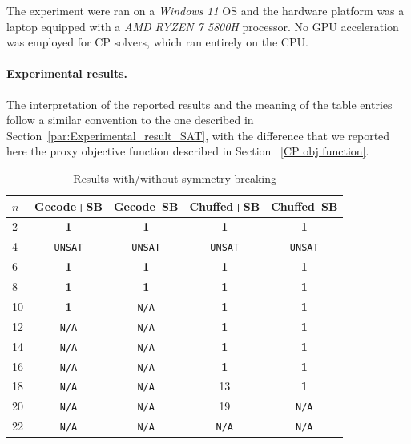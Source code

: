 The experiment were ran on a \textit{Windows 11} OS and the hardware platform was a laptop equipped with a \textit{AMD RYZEN 7 5800H} processor. No GPU acceleration was employed for CP solvers, which ran entirely on
the CPU.  \\



\paragraph{Experimental results.}
The interpretation of the reported results and the meaning of the table entries follow a similar convention to the one described in Section~\ref{par:Experimental_result_SAT}, with the difference that we reported here the proxy objective function described in Section ~\ref{CP obj function}.
\begin{table}[h]
\centering
\caption{Results with/without symmetry breaking}
\label{tab:cp}
\begin{tabular}{lcccc}
\toprule
\textbf{$n$} & \textbf{Gecode+SB} & \textbf{Gecode--SB} & \textbf{Chuffed+SB} & \textbf{Chuffed--SB}\\
\midrule
2  & \textbf{1} & \textbf{1} & \textbf{1} & \textbf{1} \\
4  &\texttt{UNSAT}&\texttt{UNSAT}&\texttt{UNSAT}&\texttt{UNSAT}\\
6  & \textbf{1}  &\textbf{1}  & \textbf{1} & \textbf{1} \\
8  & \textbf{1}  & \textbf{1} & \textbf{1} & \textbf{1} \\
10 & \textbf{1}  &\texttt{N/A}& \textbf{1} & \textbf{1} \\
12 & \texttt{N/A}&\texttt{N/A}& \textbf{1} & \textbf{1} \\
14 & \texttt{N/A}&\texttt{N/A}& \textbf{1} & \textbf{1} \\
16 & \texttt{N/A}&\texttt{N/A}& \textbf{1} & \textbf{1} \\
18 & \texttt{N/A}&\texttt{N/A}& 13         & \textbf{1}     \\
20 & \texttt{N/A}&\texttt{N/A}& 19         &\texttt{N/A}\\
22 & \texttt{N/A}&\texttt{N/A}& \texttt{N/A} &\texttt{N/A}\\
\bottomrule
\end{tabular}
\end{table}

